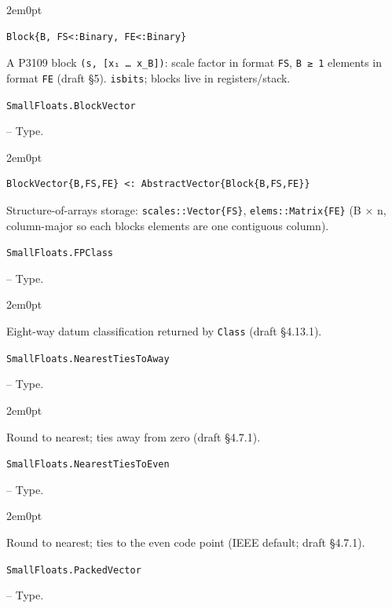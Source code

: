 \begin{adjustwidth}{2em}{0pt}


\begin{verbatim}
Block{B, FS<:Binary, FE<:Binary}
\end{verbatim}

A P3109 block \texttt{(s, [x₁ … x\_B])}: scale factor in format \texttt{FS}, \texttt{B ≥ 1} elements in format \texttt{FE} (draft §5). \texttt{isbits}; blocks live in registers/stack.



\end{adjustwidth}
\hypertarget{1380584316956099505}{\texttt{SmallFloats.BlockVector}}  -- {Type.}

\begin{adjustwidth}{2em}{0pt}


\begin{verbatim}
BlockVector{B,FS,FE} <: AbstractVector{Block{B,FS,FE}}
\end{verbatim}

Structure-of-arrays storage: \texttt{scales::Vector\{FS\}}, \texttt{elems::Matrix\{FE\}} (B × n, column-major so each block{\textquotesingle}s elements are one contiguous column).



\end{adjustwidth}
\hypertarget{3620020081592949828}{\texttt{SmallFloats.FPClass}}  -- {Type.}

\begin{adjustwidth}{2em}{0pt}

Eight-way datum classification returned by \texttt{Class} (draft §4.13.1).



\end{adjustwidth}
\hypertarget{10417286468662382093}{\texttt{SmallFloats.NearestTiesToAway}}  -- {Type.}

\begin{adjustwidth}{2em}{0pt}

Round to nearest; ties away from zero (draft §4.7.1).



\end{adjustwidth}
\hypertarget{1826807226245170700}{\texttt{SmallFloats.NearestTiesToEven}}  -- {Type.}

\begin{adjustwidth}{2em}{0pt}

Round to nearest; ties to the even code point (IEEE default; draft §4.7.1).



\end{adjustwidth}
\hypertarget{4445951075310959743}{\texttt{SmallFloats.PackedVector}}  -- {Type.}

